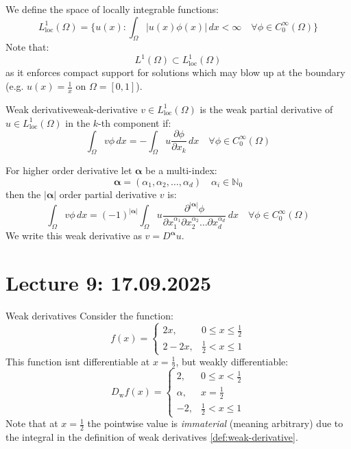 We define the space of locally integrable functions:
\[
    L_{\text{loc}}^1(\Omega) = \{u(x) : \int_{\Omega} |u(x) \phi(x)| \, dx < \infty \quad \forall \phi \in C_0^\infty(\Omega)\}
\]
Note that:
\[
    L^1(\Omega) \subset L_{\text{loc}}^1(\Omega)
\]
as it enforces compact support for solutions which may blow up at the boundary (e.g. $u(x) = \frac1x$ on $\Omega = [0, 1]$).

\begin{definition}{Weak derivative}{weak-derivative}
    $v \in L_{\text{loc}}^1(\Omega)$ is the weak partial derivative of $u \in L_{\text{loc}}^1(\Omega)$ in the $k$-th component if:
    \[
        \int_\Omega v \phi \, dx = -\int_\Omega u \frac{\partial \phi}{\partial x_k} \, dx \quad \forall \phi \in C_0^\infty(\Omega)
    \]
\end{definition}

For higher order derivative let $\symbf{\alpha}$ be a multi-index:
\[\symbf{\alpha} = (\alpha_1, \alpha_2, \ldots, \alpha_d) \quad \alpha_i \in \mathbb{N}_0\]
then the $|\symbf{\alpha}|$ order partial derivative  $v$ is:
\[
    \int_\Omega v \phi \, dx = (-1)^{|\symbf{\alpha}|} \int_\Omega u \frac{\partial^{|\symbf{\alpha}|} \phi}{\partial x_1^{\alpha_1} \partial x_2^{\alpha_2} \ldots \partial x_d^{\alpha_d}} \, dx \quad \forall \phi \in C_0^\infty(\Omega)
\]
We write this weak derivative as $v = D^{\symbf{\alpha}} u$.

\section{Lecture 9: 17.09.2025}

\begin{example}{Weak derivatives}{}
    Consider the function:
    \[
        f(x) =
        \begin{cases}
            2x,     & 0 \leq x \leq \frac{1}{2} \\
            2 - 2x, & \frac{1}{2} < x \leq 1
        \end{cases}
    \]
    This function isnt differentiable at $x = \frac12$, but weakly differentiable:
    \[
        D_{\mathrm{w}} f(x) =
        \begin{cases}
            2,      & 0 \leq x < \frac{1}{2} \\
            \alpha, & x = \frac{1}{2}        \\
            -2,     & \frac{1}{2} < x \leq 1
        \end{cases}
    \]
    Note that at $x = \frac12$ the pointwise value is \emph{immaterial} (meaning arbitrary) due to the integral in the definition of weak derivatives \autoref{def:weak-derivative}.
\end{example}

